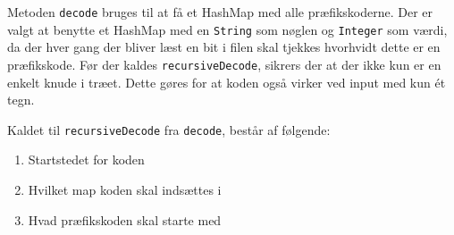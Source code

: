 \documentclass{article}
\begin{document}
Metoden \texttt{decode} bruges til at få et HashMap med alle præfikskoderne. Der er valgt at benytte et HashMap med en \texttt{String} som nøglen og \texttt{Integer} som værdi, da der hver gang der bliver læst en bit i filen skal tjekkes hvorhvidt dette er en præfikskode.
Før der kaldes \texttt{recursiveDecode}, sikrers der at der ikke kun er en enkelt knude i træet. Dette gøres for at koden også virker ved input med kun ét tegn.

Kaldet til \texttt{recursiveDecode} fra \texttt{decode}, består af følgende: 
\begin{enumerate}
    \item Startstedet for koden
    \item Hvilket map koden skal indsættes i
    \item Hvad præfikskoden skal starte med
\end{enumerate}
\end{document}

